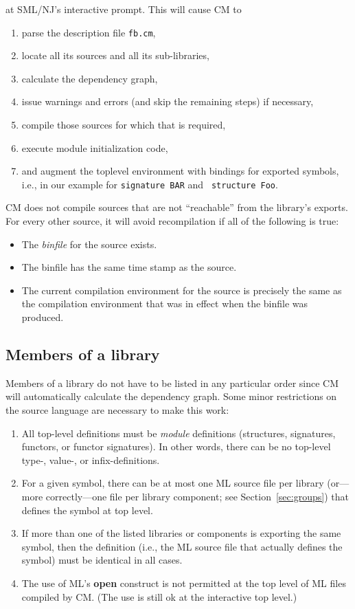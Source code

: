 \documentclass[titlepage,letterpaper]{article}
\begin{document}
at SML/NJ's interactive prompt.  This will cause CM to

\begin{enumerate}
\item parse the description file {\tt fb.cm},
\item locate all its sources and all its sub-libraries,
\item calculate the dependency graph,
\item issue warnings and errors (and skip the remaining steps) if
necessary,
\item compile those sources for which that is required,
\item execute module initialization code,
\item and augment the toplevel environment with bindings for exported
symbols, i.e., in our example for {\tt signature BAR} and {\tt
structure Foo}.
\end{enumerate}

CM does not compile sources that are not ``reachable'' from the
library's exports.  For every other source, it will avoid
recompilation if all of the following is true:

\begin{itemize}
\item The {\em binfile} for the source exists.
\item The binfile has the same time stamp as the source.
\item The current compilation environment for the source is precisely
the same as the compilation environment that was in effect when the
binfile was produced.
\end{itemize}

\subsection{Members of a library}

Members of a library do not have to be listed in any particular order
since CM will automatically calculate the dependency graph.  Some
minor restrictions on the source language are necessary to make this
work:
\begin{enumerate}
\item All top-level definitions must be {\em module} definitions
(structures, signatures, functors, or functor signatures).  In other
words, there can be no top-level type-, value-, or infix-definitions.
\item For a given symbol, there can be at most one ML source file per
library (or---more correctly---one file per library component; see
Section~\ref{sec:groups}) that defines the symbol at top level.
\item If more than one of the listed libraries or components is
exporting the same symbol, then the definition (i.e., the ML source
file that actually defines the symbol) must be identical in all cases.
\label{rule:diamond}
\item The use of ML's {\bf open} construct is not permitted at the top
level of ML files compiled by CM.  (The use is still ok at the
interactive top level.)
\end{enumerate}
\end{document}
